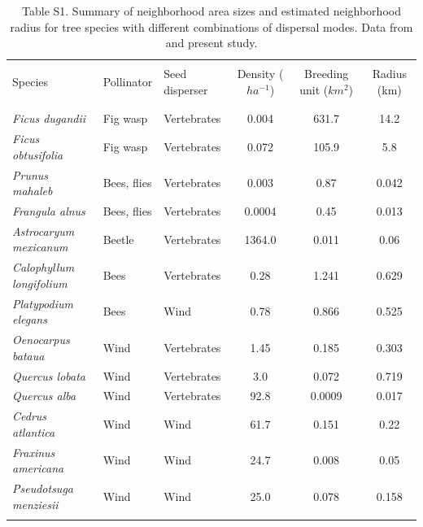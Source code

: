 \documentclass[a4paper, 12pt]{article}
\begin{document}
\begin{landscape}
\begin{table}
  \caption*{Table S1. Summary of neighborhood area sizes and estimated neighborhood radius for tree species with different combinations of dispersal modes. Data from \citet{Nason:1998aa,Smouse:2001aa,Garcia:2005fu,Garcia:2007he,Dutech:2005fk,Ottewell:2012hu} and present study.}
  \vspace{0.5cm}
    \begin{tabular}{lllccc}
        \hline \\
     Species                & Pollinator  & Seed disperser & Density ($ha^{-1}$) & Breeding unit ($km^2$) & Radius (km) \\\\ \hline \\
    \textit{Ficus dugandii}          & Fig wasp    & Vertebrates    & 0.004          & 631.7               & 14.2        \\
    \textit{Ficus obtusifolia}       & Fig wasp    & Vertebrates    & 0.072          & 105.9               & 5.8         \\
    \textit{Prunus mahaleb}          & Bees, flies & Vertebrates    & 0.003          & 0.87                & 0.042       \\
    \textit{Frangula alnus}          & Bees, flies & Vertebrates    & 0.0004         & 0.45                & 0.013       \\
    \textit{Astrocaryum mexicanum}   & Beetle      & Vertebrates    & 1364.0         & 0.011               & 0.06        \\
    \textit{Calophyllum longifolium} & Bees        & Vertebrates    & 0.28           & 1.241               & 0.629       \\
    \textit{Platypodium elegans}     & Bees        & Wind           & 0.78           & 0.866               & 0.525       \\
    \textit{Oenocarpus bataua}          & Wind        & Vertebrates    & 1.45
      & 0.185               & 0.303       \\ 
    \textit{Quercus lobata}          & Wind        & Vertebrates    & 3.0
      & 0.072               & 0.719       \\ 
    \textit{Quercus alba}            & Wind        & Vertebrates    & 92.8
      & 0.0009              & 0.017       \\ 
    \textit{Cedrus atlantica}        & Wind        & Wind           & 61.7           & 0.151               & 0.22        \\
   \textit{Fraxinus americana}       & Wind        & Wind           & 24.7           & 0.008                & 0.05        \\
    \textit{Pseudotsuga menziesii}   & Wind        & Wind           & 25.0           & 0.078               & 0.158       \\\\
\hline
    \end{tabular}
\end{table}
\end{landscape}
\newpage 
\end{document}
